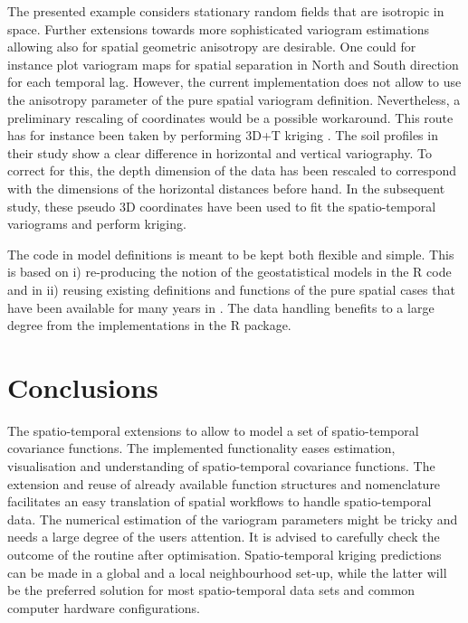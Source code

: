 The presented example considers stationary random fields that are isotropic in space. Further extensions towards more sophisticated variogram estimations allowing also for spatial geometric anisotropy are desirable. One could for instance plot variogram maps for spatial separation in North and South direction for each temporal lag. However, the current implementation does not allow to use the anisotropy parameter  of the pure spatial variogram definition. Nevertheless, a preliminary rescaling of coordinates would be a possible workaround. This route has for instance been taken by \citet{Gasch2015} performing 3D+T kriging . The soil profiles in their study show a clear difference in horizontal and vertical variography. To correct for this, the depth dimension of the data has been rescaled to correspond with the dimensions of the horizontal distances before hand. In the subsequent study, these pseudo 3D coordinates have been used to fit the spatio-temporal variograms and perform kriging. 

The code in model definitions is meant to be kept both flexible and simple. This is based on i) re-producing the notion of the geostatistical models in the R code and in ii) reusing existing definitions and functions of the pure spatial cases that have been available for many years in . The data handling benefits to a large degree from the implementations in the  R package.


\section{Conclusions}\label{sec:conclusions}

The spatio-temporal extensions to  allow to model a set of spatio-temporal covariance functions. The implemented functionality eases estimation, visualisation and understanding of spatio-temporal covariance functions. The extension and reuse of already available function structures and nomenclature facilitates an easy translation of spatial workflows to handle spatio-temporal data. The numerical estimation of the variogram parameters might be tricky and needs a large degree of the users attention. It is advised to carefully check the outcome of the  routine after optimisation. Spatio-temporal kriging predictions can be made in a global and a local neighbourhood set-up, while the latter will be the preferred solution for most spatio-temporal data sets and common computer hardware configurations. 

